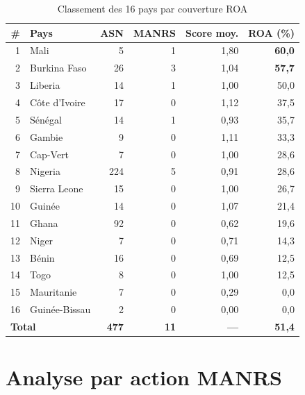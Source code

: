 \documentclass{eneam}
\begin{document}
\begin{table}[H]
\caption{Classement des 16 pays par couverture ROA}
\label{tab:pays}
\centering
\begin{tabular}{|r|l|r|r|r|r|}
\hline
\textbf{\#} & \textbf{Pays} & \textbf{ASN} & \textbf{MANRS} & \textbf{Score moy.} & \textbf{ROA (\%)} \\
\hline
1  & Mali              & 5   & 1 & 1,80 & \textcolor{passgreen}{\textbf{60,0}} \\
2  & Burkina Faso      & 26  & 3 & 1,04 & \textcolor{passgreen}{\textbf{57,7}} \\
3  & Liberia           & 14  & 1 & 1,00 & 50,0 \\
4  & Côte d'Ivoire     & 17  & 0 & 1,12 & 37,5 \\
5  & Sénégal           & 14  & 1 & 0,93 & 35,7 \\
6  & Gambie            & 9   & 0 & 1,11 & 33,3 \\
7  & Cap-Vert          & 7   & 0 & 1,00 & 28,6 \\
8  & Nigeria           & 224 & 5 & 0,91 & 28,6 \\
9  & Sierra Leone      & 15  & 0 & 1,00 & 26,7 \\
10 & Guinée            & 14  & 0 & 1,07 & \textcolor{warnorg}{21,4} \\
11 & Ghana             & 92  & 0 & 0,62 & \textcolor{warnorg}{19,6} \\
12 & Niger             & 7   & 0 & 0,71 & \textcolor{failred}{14,3} \\
13 & Bénin             & 16  & 0 & 0,69 & \textcolor{failred}{12,5} \\
14 & Togo              & 8   & 0 & 1,00 & \textcolor{failred}{12,5} \\
15 & Mauritanie        & 7   & 0 & 0,29 & \textcolor{failred}{0,0} \\
16 & Guinée-Bissau     & 2   & 0 & 0,00 & \textcolor{failred}{0,0} \\
\hline
\multicolumn{2}{|l|}{\textbf{Total}} & \textbf{477} & \textbf{11} & \textbf{---} & \textbf{51,4} \\
\hline
\end{tabular}
\end{table}

\section{Analyse par action MANRS}
\end{document}
